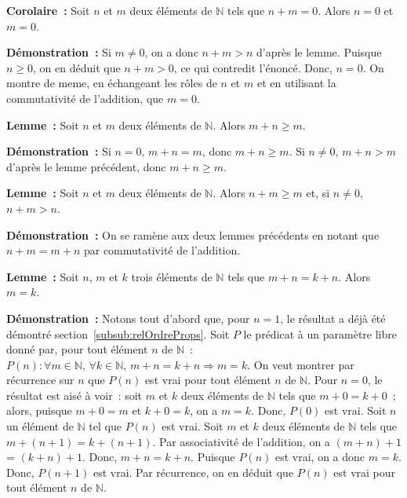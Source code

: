    \done 

\medskip

\noindent\textbf{Corolaire :} Soit $n$ et $m$ deux éléments de $\mathbb{N}$ tels que $n + m = 0$. Alors $n = 0$ et $m = 0$. 

\medskip

\noindent\textbf{Démonstration :} 
    Si $m \neq 0$, on a donc $n + m > n$ d'après le lemme. Puisque $n \geq 0$, on en déduit que $n + m > 0$, ce qui contredit l'énoncé. 
    Donc, $n = 0$.
    On montre de meme, en échangeant les rôles de $n$ et $m$ et en utilisant la commutativité de l'addition, que $m = 0$.

   \done 

\medskip

\noindent\textbf{Lemme :} Soit $n$ et $m$ deux éléments de $\mathbb{N}$. Alors $m+n \geq m$. 

\medskip

\noindent\textbf{Démonstration :} 
    Si $n=0$, $m+n=m$, donc $m+n \geq m$. 
    Si $n \neq 0$, $m+n > m$ d'après le lemme précédent, donc $m+n \geq m$.
    
   \done 

\medskip

\noindent\textbf{Lemme :} Soit $n$ et $m$ deux éléments de $\mathbb{N}$. Alors $n+m \geq m$ et, si $n \neq 0$, $n+m > n$. 

\medskip

\noindent\textbf{Démonstration :} 
    On se ramène aux deux lemmes précédents en notant que $n+m=m+n$ par commutativité de l'addition.
    
   \done 

\medskip

\noindent\textbf{Lemme :} Soit $n$, $m$ et $k$ trois éléments de $\mathbb{N}$ tels que $m+n=k+n$. Alors  $m=k$.

\medskip

\noindent\textbf{Démonstration :} 
    Notons tout d'abord que, pour $n=1$, le résultat a déjà été démontré section~\ref{subsub:relOrdreProps}.
    Soit $P$ le prédicat à un paramètre libre donné par, pour tout élément $n$ de $\mathbb{N}$ : $P(n): \forall m \in \mathbb{N}, \, \forall k \in \mathbb{N}, \, m+n=k+n \Rightarrow m=k$.
    On veut montrer par récurrence sur $n$ que $P(n)$ est vrai pour tout élément $n$ de $\mathbb{N}$. 
    Pour $n=0$, le résultat est aisé à voir : soit $m$ et $k$ deux éléments de $\mathbb{N}$ tels que $m+0=k+0$ ; alors, puisque $m+0=m$ et $k+0=k$, on a $m=k$. 
    Donc, $P(0)$ est vrai.
    Soit $n$ un élément de $\mathbb{N}$ tel que $P(n)$ est vrai. 
    Soit $m$ et $k$ deux éléments de $\mathbb{N}$ tels que $m+(n+1) = k+(n+1)$. 
    Par associativité de l'addition, on a $(m+n)+1$ = $(k+n)+1$. 
    Donc, $m+n=k+n$. 
    Puisque $P(n)$ est vrai, on a donc $m=k$. 
    Donc, $P(n+1)$ est vrai. 
    Par récurrence, on en déduit que $P(n)$ est vrai pour tout élément $n$ de $\mathbb{N}$.

